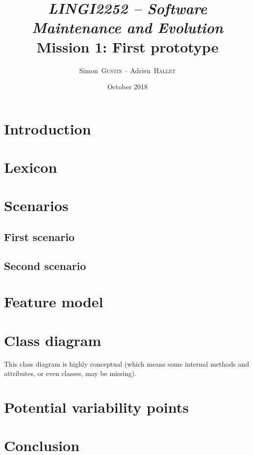 \documentclass[english]{article}
\title{\textit{LINGI2252 -- Software Maintenance and Evolution}\\Mission 1: First prototype}
\author{Simon~\textsc{Gustin} -- Adrien~\textsc{Hallet}}
\date{October 2018}
\begin{document}
  \maketitle

	\section{Introduction}
	
	\section{Lexicon}
	
	\section{Scenarios}
		\subsection{First scenario}
		
		\subsection{Second scenario}
		
	\section{Feature model}
	
	\section{Class diagram}
		This class diagram is highly conceptual (which means some internal methods and attributes, or even classes, may be missing).
		
	\section{Potential variability points}
	
	\section{Conclusion}
\end{document}
